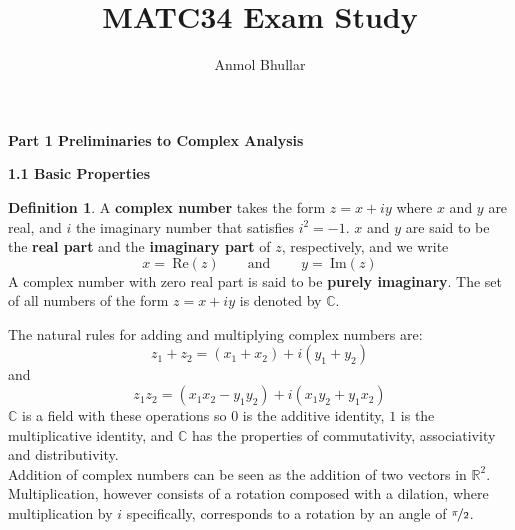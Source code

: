 \documentclass{article}
\title{MATC34 Exam Study}
\author{Anmol Bhullar}
\theoremstyle{definition}
\newtheorem{definition}{Definition}[section]
\theoremstyle{remark}
\begin{document}
    \maketitle

    \textbf{Part 1 Preliminaries to Complex Analysis}

    \textbf{1.1 Basic Properties}
    \begin{definition}
        A \textbf{complex number} takes the form $z = x + iy$ where $x$ and $y$ are real, and $i$ the imaginary 
        number that satisfies $i^2 = -1$. $x$ and $y$ are said to be the \textbf{real part} and the \textbf{imaginary part}
        of $z$, respectively, and we write
        \[ x =\: \text{Re}(z) \qquad\text{and}\qquad\:y=\:\text{Im}(z) \]
        A complex number with zero real part is said to be \textbf{purely imaginary}. The set of all numbers of the form
        $z = x + iy$ is denoted by $\mathbb{C}$.
    \end{definition}

    The natural rules for adding and multiplying complex numbers are:
    \[ z_1 + z_2 = (x_1+x_2) + i(y_1+y_2) \]
    and
    \[ z_1z_2 = (x_1x_2-y_1y_2)+i(x_1y_2+y_1x_2) \]
    $\mathbb{C}$ is a field with these operations so $0$ is the additive identity, $1$ is the multiplicative identity, and $\mathbb{C}$
    has the properties of commutativity, associativity and distributivity.\\
    Addition of  complex numbers can be seen as the addition of two vectors in $\mathbb{R}^2$. Multiplication, however consists of a
    rotation composed with a dilation, where multiplication by $i$ specifically, corresponds to a rotation by an angle of 
    $\nicefrac{\pi}{2}$.
\end{document}
